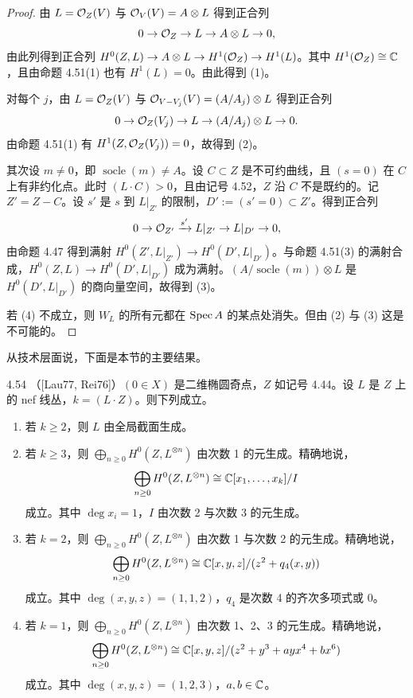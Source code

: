 \begin{proof}
由 $L=\mathcal{O}_Z(V)$ 与 $\mathcal{O}_V(V)=A\otimes L$ 得到正合列
\[ 0\to\mathcal{O}_Z\to L\to A\otimes L\to 0, \]
由此列得到正合列 $H^0(Z,L)\to A\otimes L\to H^1(\mathcal{O}_Z)\to H^1(L)$。其中 $H^1(\mathcal{O}_Z)\cong\mathbb{C}$，且由命题 4.51(1) 也有 $H^1(L)=0$。由此得到 (1)。

对每个 $j$，由 $L=\mathcal{O}_Z(V)$ 与 $\mathcal{O}_{V-V_j}(V)=(A/A_j)\otimes L$ 得到正合列
\[ 0\to\mathcal{O}_Z(V_j)\to L\to(A/A_j)\otimes L\to 0. \]
由命题 4.51(1) 有 $H^1(Z,\mathcal{O}_Z(V_j))=0$，故得到 (2)。

其次设 $m\neq 0$，即 $\operatorname{socle}(m)\neq A$。设 $C\subset Z$ 是不可约曲线，且 $(s=0)$ 在 $C$ 上有非约化点。此时 $(L\cdot C)>0$，且由记号 4.52，$Z$ 沿 $C$ 不是既约的。记 $Z'=Z-C$。设 $s'$ 是 $s$ 到 $L|_{Z'}$ 的限制，$D':=(s'=0)\subset Z'$。得到正合列
\[ 0\to\mathcal{O}_{Z'}\xrightarrow{s'}L|_{Z'}\to L|_{D'}\to 0, \]
由命题 4.47 得到满射 $H^0(Z',L|_{Z'})\to H^0(D',L|_{D'})$。与命题 4.51(3) 的满射合成，$H^0(Z,L)\to H^0(D',L|_{D'})$ 成为满射。$(A/\operatorname{socle}(m))\otimes L$ 是 $H^0(D',L|_{D'})$ 的商向量空间，故得到 (3)。

若 (4) 不成立，则 $W_L$ 的所有元都在 $\operatorname{Spec} A$ 的某点处消失。但由 (2) 与 (3) 这是不可能的。
\end{proof}

从技术层面说，下面是本节的主要结果。

\begin{propositionp}{4.54}
（[Lau77, Rei76]）$(0\in X)$ 是二维椭圆奇点，$Z$ 如记号 4.44。设 $L$ 是 $Z$ 上的 nef 线丛，$k=(L\cdot Z)$。则下列成立。
\begin{enumerate}[label=(\arabic*),leftmargin=2.4em,itemsep=1pt,topsep=2pt]
\item 若 $k\ge 2$，则 $L$ 由全局截面生成。
\item 若 $k\ge 3$，则 $\bigoplus_{n\ge 0}H^0(Z,L^{\otimes n})$ 由次数 1 的元生成。精确地说，
\[ \bigoplus_{n\ge 0}H^0(Z,L^{\otimes n})\cong\mathbb{C}[x_1,\dots,x_k]/I \]
成立。其中 $\deg x_i=1$，$I$ 由次数 2 与次数 3 的元生成。
\item 若 $k=2$，则 $\bigoplus_{n\ge 0}H^0(Z,L^{\otimes n})$ 由次数 1 与次数 2 的元生成。精确地说，
\[ \bigoplus_{n\ge 0}H^0(Z,L^{\otimes n})\cong\mathbb{C}[x,y,z]/(z^2+q_4(x,y)) \]
成立。其中 $\deg(x,y,z)=(1,1,2)$，$q_4$ 是次数 4 的齐次多项式或 0。
\item 若 $k=1$，则 $\bigoplus_{n\ge 0}H^0(Z,L^{\otimes n})$ 由次数 1、2、3 的元生成。精确地说，
\[ \bigoplus_{n\ge 0}H^0(Z,L^{\otimes n})\cong\mathbb{C}[x,y,z]/(z^2+y^3+ayx^4+bx^6) \]
成立。其中 $\deg(x,y,z)=(1,2,3)$，$a,b\in\mathbb{C}$。
\end{enumerate}
\end{propositionp}

